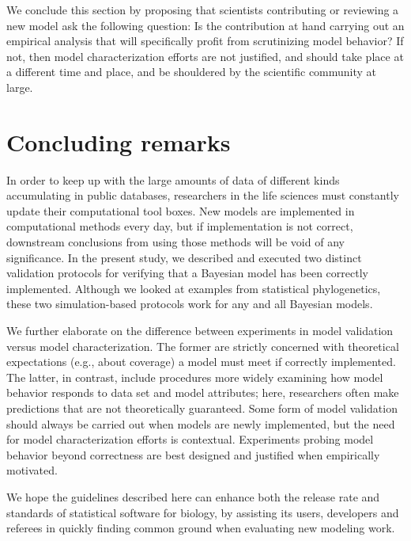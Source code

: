 \documentclass[oneside]{article}
\begin{document}
We conclude this section by proposing that scientists contributing or reviewing a new model ask the following question: Is the contribution at hand carrying out an empirical analysis that will specifically profit from scrutinizing model behavior?
If not, then model characterization efforts are not justified, and should take place at a different time and place, and be shouldered by the scientific community at large.

\section*{Concluding remarks}


In order to keep up with the large amounts of data of different kinds accumulating in public databases, researchers in the life sciences must constantly update their computational tool boxes.
New models are implemented in computational methods every day, but if implementation is not correct, downstream conclusions from using those methods will be void of any significance.
In the present study, we described and executed two distinct validation protocols for verifying that a Bayesian model has been correctly implemented.
Although we looked at examples from statistical phylogenetics, these two simulation-based protocols work for any and all Bayesian models.

We further elaborate on the difference between experiments in model validation versus model characterization.
The former are strictly concerned with theoretical expectations (e.g., about coverage) a model must meet if correctly implemented.
The latter, in contrast, include procedures more widely examining how model behavior responds to data set and model attributes; here, researchers often make predictions that are not theoretically guaranteed.
Some form of model validation should always be carried out when models are newly implemented, but the need for model characterization efforts is contextual.
Experiments probing model behavior beyond correctness are best designed and justified when empirically motivated.

We hope the guidelines described here can enhance both the release rate and standards of statistical software for biology, by assisting its users, developers and referees in quickly finding common ground when evaluating new modeling work.
\end{document}
